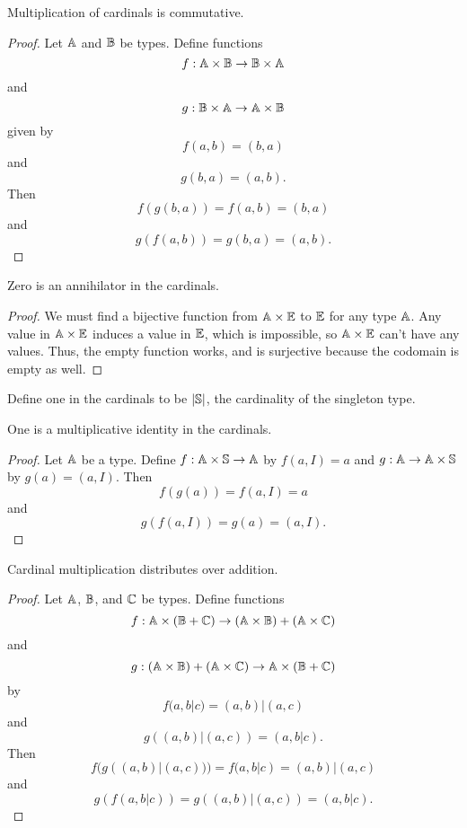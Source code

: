 \documentclass[../../math.tex]{subfiles}
\begin{document}
\begin{instance}
    Multiplication of cardinals is commutative.
\end{instance}
\begin{proof}
    Let $\A$ and $\B$ be types.  Define functions
    \[
        f : \A \times \B \to \B \times \A
    \]
    and
    \[
        g : \B \times \A \to \A \times \B
    \]
    given by
    \[
        f(a, b) = (b, a)
    \]
    and
    \[
        g(b, a) = (a, b).
    \]
    Then
    \[
        f(g(b, a)) = f(a, b) = (b, a)
    \]
    and
    \[
        g(f(a, b)) = g(b, a) = (a, b).
    \]
\end{proof}

\begin{instance}
    Zero is an annihilator in the cardinals.
\end{instance}
\begin{proof}
    We must find a bijective function from $\A \times \E$ to $\E$ for any type
    $\A$.  Any value in $\A \times \E$ induces a value in $\E$, which is
    impossible, so $\A \times \E$ can't have any values.  Thus, the empty
    function works, and is surjective because the codomain is empty as well.
\end{proof}

\begin{instance}
    Define one in the cardinals to be $|\S|$, the cardinality of the singleton
    type.
\end{instance}

\begin{instance}
    One is a multiplicative identity in the cardinals.
\end{instance}
\begin{proof}
    Let $\A$ be a type.  Define $f : \A \times \S \to \A$ by $f(a, I) = a$ and
    $g : \A \to \A \times \S$ by $g(a) = (a, I)$.  Then
    \[
        f(g(a)) = f(a, I) = a
    \]
    and
    \[
        g(f(a, I)) = g(a) = (a, I).
    \]
\end{proof}

\begin{instance}
    Cardinal multiplication distributes over addition.
\end{instance}
\begin{proof}
    Let $\A$, $\B$, and $\C$ be types.  Define functions
    \[
        f : \A \times (\B + \C) \to (\A \times \B) + (\A \times \C)
    \]
    and
    \[
        g : (\A \times \B) + (\A \times \C) \to \A \times (\B + \C)
    \]
    by
    \[
        f(a, b|c) = (a, b)|(a, c)
    \]
    and
    \[
        g((a, b)|(a, c)) = (a, b|c).
    \]
    Then
    \[
        f(g((a, b)|(a, c))) = f(a, b|c) = (a, b)|(a, c)
    \]
    and
    \[
        g(f(a, b|c)) = g((a, b)|(a, c)) = (a, b|c).
    \]
\end{proof}
\end{document}
